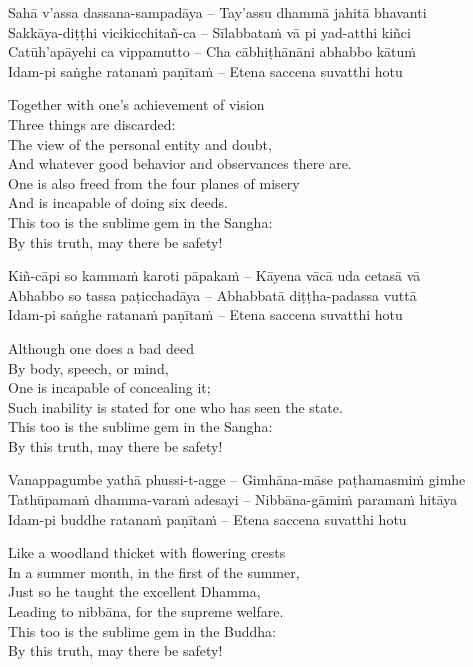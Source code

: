 Sahā v'assa dassana-sampadāya – Tay'assu dhammā jahitā bhavanti\\
Sakkāya-diṭṭhi vicikicchitañ-ca – Sīlabbataṁ vā pi yad-atthi kiñci\\
Catūh'apāyehi ca vippamutto – Cha cābhiṭhānāni abhabbo kātuṁ\\
Idam-pi saṅghe ratanaṁ paṇītaṁ – Etena saccena suvatthi hotu

\begin{english-verses}
  Together with one's achievement of vision\\
  Three things are discarded:\\
  The view of the personal entity and doubt,\\
  And whatever good behavior and observances there are.\\
  One is also freed from the four planes of misery\\
  And is incapable of doing six deeds.\\
  This too is the sublime gem in the Sangha:\\
  By this truth, may there be safety!
\end{english-verses}

Kiñ-cāpi so kammaṁ karoti pāpakaṁ – Kāyena vācā uda cetasā vā\\
Abhabbo so tassa paṭicchadāya – Abhabbatā diṭṭha-padassa vuttā\\
Idam-pi saṅghe ratanaṁ paṇītaṁ – Etena saccena suvatthi hotu

\begin{english-verses}
  Although one does a bad deed\\
  By body, speech, or mind,\\
  One is incapable of concealing it;\\
  Such inability is stated for one who has seen the state.\\
  This too is the sublime gem in the Sangha:\\
  By this truth, may there be safety!
\end{english-verses}

Vanappagumbe yathā phussi-t-agge – Gimhāna-māse paṭhamasmiṁ gimhe\\
Tathūpamaṁ dhamma-varaṁ adesayi – Nibbāna-gāmiṁ paramaṁ hitāya\\
Idam-pi buddhe ratanaṁ paṇītaṁ – Etena saccena suvatthi hotu

\begin{english-verses}
  Like a woodland thicket with flowering crests\\
  In a summer month, in the first of the summer,\\
  Just so he taught the excellent Dhamma,\\
  Leading to nibbāna, for the supreme welfare.\\
  This too is the sublime gem in the Buddha:\\
  By this truth, may there be safety!
\end{english-verses}


